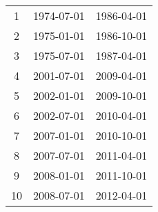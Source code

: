 % 
\begin{tabular}{ccc}
  \hline
  \hline
1 & 1974-07-01 & 1986-04-01 \\ 
  2 & 1975-01-01 & 1986-10-01 \\ 
  3 & 1975-07-01 & 1987-04-01 \\ 
  4 & 2001-07-01 & 2009-04-01 \\ 
  5 & 2002-01-01 & 2009-10-01 \\ 
  6 & 2002-07-01 & 2010-04-01 \\ 
  7 & 2007-01-01 & 2010-10-01 \\ 
  8 & 2007-07-01 & 2011-04-01 \\ 
  9 & 2008-01-01 & 2011-10-01 \\ 
  10 & 2008-07-01 & 2012-04-01 \\ 
   \hline
\end{tabular}

